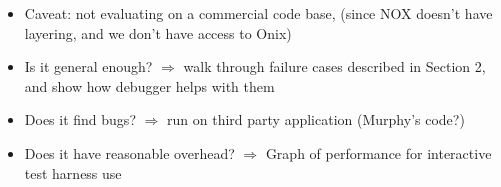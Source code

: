 \begin{itemize}

\item Caveat: not evaluating on a commercial code base, (since NOX doesn't have layering, and we don't have access to Onix)

\item Is it general enough? $\Rightarrow$ walk through failure cases described in Section 2, and show how debugger helps with them

\item Does it find bugs? $\Rightarrow$ run on third party application (Murphy's code?)

\item Does it have reasonable overhead? $\Rightarrow$ Graph of performance for interactive test harness use

\end{itemize}
